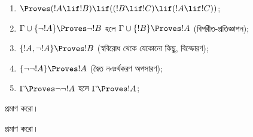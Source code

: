 \documentclass[../../../include/open-logic-section]{subfiles}
\begin{document}
\begin{prop}
\begin{enumerate}
\item $\Proves (!A \lif !B) \lif ((!B \lif !C)
  \lif (!A \lif !C))$; 
\item $\Gamma \cup \{ \lnot !A\}
  \Proves \lnot !B$ হলে $\Gamma \cup \{ !B\} \Proves
  !A$ (বিপরীত-প্রতিজ্ঞাপন); 
\item  $\{ !A, \lnot!A\} \Proves
    !B$ (স্ববিরোধ থেকে যেকোনো কিছু, বিস্ফোরণ); 
\item  $\{ \lnot\lnot!A\} \Proves
  !A$ (দ্বৈত নঞর্থকরণ অপসারণ);
\item $\Gamma \Proves \lnot\lnot!A$ হলে $\Gamma \Proves
  !A$;
\end{enumerate}
\end{prop}

\begin{prob}
   প্রমাণ করো।
\end{prob}
\tagendprob

\begin{prob}
   প্রমাণ করো।
\end{prob}
\tagendprob
\end{document}
